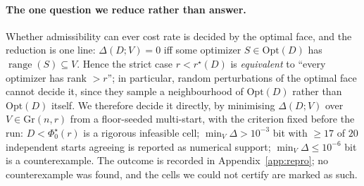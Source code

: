 \paragraph{The one question we reduce rather than answer.} Whether admissibility
can ever cost rate is decided by the optimal face, and the reduction is one line:
$\Delta(D;V)=0$ iff some optimizer $S\in\mathrm{Opt}(D)$ has
$\operatorname{range}(S)\subseteq V$. Hence the strict case $r<r^{\star}(D)$ is
\emph{equivalent} to ``every optimizer has rank $>r$''; in particular, random
perturbations of the optimal face cannot decide it, since they sample a
neighbourhood of $\mathrm{Opt}(D)$ rather than $\mathrm{Opt}(D)$ itself. We
therefore decide it directly, by minimising $\Delta(D;V)$ over
$V\in\mathrm{Gr}(n,r)$ from a floor-seeded multi-start, with the criterion fixed
before the run: $D<\Phi_0^{\star}(r)$ is a rigorous infeasible cell;
$\min_V\Delta>10^{-3}$ bit with $\ge17$ of $20$ independent starts agreeing is
reported as numerical support; $\min_V\Delta\le10^{-6}$ bit is a counterexample.
The outcome is recorded in Appendix~\ref{app:repro}; no counterexample was found,
and the cells we could not certify are marked as such.
